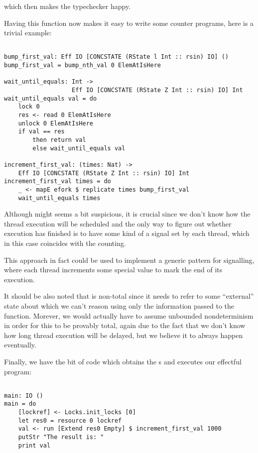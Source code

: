 which then makes the typechecker happy.

Having this function now makes it easy to write some counter programs, here is
a trivial example:

\begin{BVerbatim}

bump_first_val: Eff IO [CONCSTATE (RState l Int :: rsin) IO] ()
bump_first_val = bump_nth_val 0 ElemAtIsHere

wait_until_equals: Int ->
                   Eff IO [CONCSTATE (RState Z Int :: rsin) IO] Int
wait_until_equals val = do
    lock 0
    res <- read 0 ElemAtIsHere
    unlock 0 ElemAtIsHere
    if val == res
        then return val
        else wait_until_equals val

increment_first_val: (times: Nat) ->
    Eff IO [CONCSTATE (RState Z Int :: rsin) IO] Int
increment_first_val times = do
    _ <- mapE efork $ replicate times bump_first_val
    wait_until_equals times

\end{BVerbatim}


Although  might seems a bit suspicious, it is crucial
since we don't know how the thread execution will be scheduled and the only way
to figure out whether execution has finished is to have some kind of a signal
set by each thread, which in this case coincides with the counting.

This approach in fact could be used to implement a generic pattern for
signalling, where each thread increments some special value to mark the end of
its execution.

It should be also noted that  is non-total since
it needs to refer to some ``external'' state about which we can't reason using
only the information passed to the function. Morever, we would actually have to
assume unbounded nondeterminism in order for this to be provably total, again
due to the fact that we don't know how long thread execution will be delayed,
but we believe it to always happen eventually.

Finally, we have the bit of code which obtains the s and executes
our effectful program:

\begin{BVerbatim}

main: IO ()
main = do
    [lockref] <- Locks.init_locks [0]
    let res0 = resource 0 lockref
    val <- run [Extend res0 Empty] $ increment_first_val 1000
    putStr "The result is: "
    print val

\end{BVerbatim}

